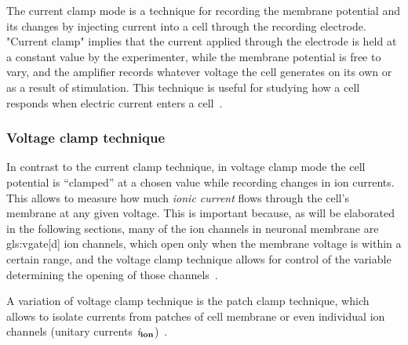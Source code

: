 \documentclass[class={myRUCProject}, crop=false]{standalone}
\begin{document}
The current clamp mode is a technique for recording the membrane potential and its changes by injecting current into a cell through the recording electrode.  "Current clamp" implies that the current applied through the electrode is held at a constant value by the experimenter, while the membrane potential is free to vary, and the amplifier records whatever voltage the cell generates on its own or as a result of stimulation. This technique is useful for studying how a cell responds when electric current enters a cell~\cite{Hammond2015ch4}.

\subsubsection{Voltage clamp technique}\label{sec:Vclamp}
 
In contrast to the current clamp technique, in voltage clamp mode the cell potential is ``clamped'' at a chosen value while recording changes in ion currents. This allows to measure how much \textit{ionic current} flows through the cell's membrane at any given voltage. This is important because, as will be elaborated in the following sections, many of the ion channels in neuronal membrane are \gls{gls:vgate}[d] ion channels, which open only when the membrane voltage is within a certain range, and the voltage clamp technique allows for control of the variable determining the opening of those channels~\cite{Hammond2015ch4}.

A variation of  voltage clamp technique is the patch clamp technique, which allows to isolate currents from patches of cell membrane or even individual ion channels (unitary currents \(\mathit{i}_\mathbf{ion}\))~\cite{Hammond2015ch4}.
\end{document}
